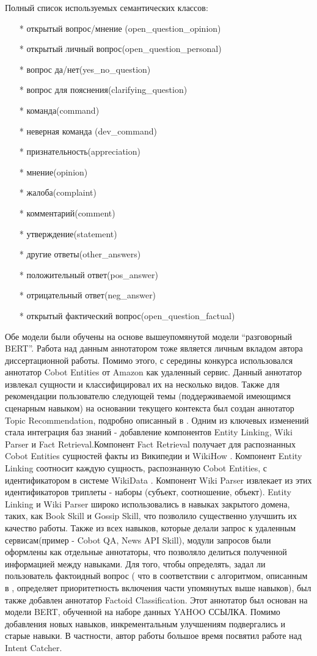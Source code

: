 Полный список используемых семантических классов:
\begin{itemize}
\item[*] открытый вопрос/мнение (open\_question\_opinion)
\item[*] открытый личный вопрос(open\_question\_personal)
\item[*] вопрос да/нет(yes\_no\_question)
\item[*] вопрос для пояснения(clarifying\_question)
\item[*] команда(command)
\item[*] неверная команда (dev\_command)
\item[*] признательность(appreciation)
\item[*] мнение(opinion)
\item[*] жалоба(complaint)
\item[*] комментарий(comment)
\item[*] утверждение(statement)
\item[*] другие ответы(other\_answers)
\item[*] положительный ответ(pos\_answer)
\item[*] отрицательный ответ(neg\_answer)
\item[*] открытый фактический вопрос(open\_question\_factual)
\end{itemize}
Обе модели были обучены на основе вышеупомянутой модели “разговорный BERT”.  Работа над данным аннотатором тоже является личным вкладом автора диссертационной работы. 
Помимо этого, с середины конкурса использовался аннотатор Cobot Entities от Amazon как удаленный сервис. Данный аннотатор извлекал сущности и классифицировал их на несколько видов.
Также для рекомендации пользователю следующей темы (поддерживаемой имеющимся сценарным навыком) на основании текущего контекста был создан аннотатор Topic Recommendation, подробно описанный в \cite{dream2}.
Одним из ключевых изменений стала интеграция баз знаний - добавление компонентов Entity Linking, Wiki Parser и Fact Retrieval.Компонент Fact Retrieval получает для распознанных Cobot Entities сущностей факты из Википедии и WikiHow \cite{wikihow}.  Компонент Entity Linking соотносит каждую сущность, распознанную Cobot Entities, с идентификатором в системе WikiData \cite{vrandei_2014}. Компонент Wiki Parser извлекает из этих идентификаторов триплеты - наборы (субъект, соотношение, объект). Entity Linking и Wiki Parser широко использовались в навыках закрытого домена, таких, как Book Skill и Gossip Skill, что позволило существенно улучшить их качество работы.
Также из всех навыков, которые делали запрос к удаленным сервисам(пример -  Cobot QA, News API Skill), модули запросов были оформлены как отдельные аннотаторы, что позволяло делиться полученной информацией между навыками.
Для того, чтобы определять, задал ли пользователь фактоидный вопрос ( что в соответствии с алгоритмом, описанным в \cite{dream2}, определяет приоритетность включения части упомянутых выше навыков), был также добавлен аннотатор Factoid Classification. Этот аннотатор был основан на модели BERT, обученной на наборе данных YAHOO ССЫЛКА.
Помимо добавления новых навыков, инкрементальным улучшениям подвергались и старые навыки. В частности, автор работы большое время посвятил работе над Intent Catcher. 


